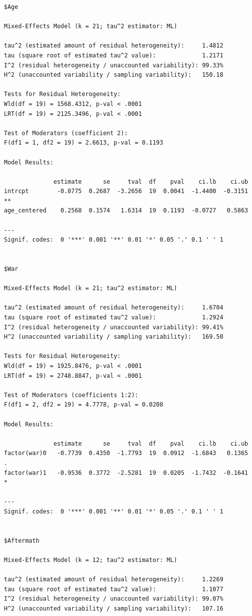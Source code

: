 \documentclass[
  letterpaper,
  DIV=11,
  numbers=noendperiod]{scrartcl}
\begin{document}
\begin{verbatim}
$Age

Mixed-Effects Model (k = 21; tau^2 estimator: ML)

tau^2 (estimated amount of residual heterogeneity):     1.4812
tau (square root of estimated tau^2 value):             1.2171
I^2 (residual heterogeneity / unaccounted variability): 99.33%
H^2 (unaccounted variability / sampling variability):   150.18

Tests for Residual Heterogeneity:
Wld(df = 19) = 1568.4312, p-val < .0001
LRT(df = 19) = 2125.3496, p-val < .0001

Test of Moderators (coefficient 2):
F(df1 = 1, df2 = 19) = 2.6613, p-val = 0.1193

Model Results:

              estimate      se     tval  df    pval    ci.lb    ci.ub     
intrcpt        -0.8775  0.2687  -3.2656  19  0.0041  -1.4400  -0.3151  ** 
age_centered    0.2568  0.1574   1.6314  19  0.1193  -0.0727   0.5863     

---
Signif. codes:  0 '***' 0.001 '**' 0.01 '*' 0.05 '.' 0.1 ' ' 1


$War

Mixed-Effects Model (k = 21; tau^2 estimator: ML)

tau^2 (estimated amount of residual heterogeneity):     1.6704
tau (square root of estimated tau^2 value):             1.2924
I^2 (residual heterogeneity / unaccounted variability): 99.41%
H^2 (unaccounted variability / sampling variability):   169.50

Tests for Residual Heterogeneity:
Wld(df = 19) = 1925.8476, p-val < .0001
LRT(df = 19) = 2748.8847, p-val < .0001

Test of Moderators (coefficients 1:2):
F(df1 = 2, df2 = 19) = 4.7778, p-val = 0.0208

Model Results:

              estimate      se     tval  df    pval    ci.lb    ci.ub    
factor(war)0   -0.7739  0.4350  -1.7793  19  0.0912  -1.6843   0.1365  . 
factor(war)1   -0.9536  0.3772  -2.5281  19  0.0205  -1.7432  -0.1641  * 

---
Signif. codes:  0 '***' 0.001 '**' 0.01 '*' 0.05 '.' 0.1 ' ' 1


$Aftermath

Mixed-Effects Model (k = 12; tau^2 estimator: ML)

tau^2 (estimated amount of residual heterogeneity):     1.2269
tau (square root of estimated tau^2 value):             1.1077
I^2 (residual heterogeneity / unaccounted variability): 99.07%
H^2 (unaccounted variability / sampling variability):   107.16


\end{verbatim}
\end{document}
